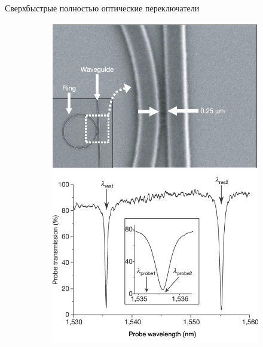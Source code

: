\begin{frame}{Сверхбыстрые полностью оптические переключатели}
	\begin{figure}
		\begin{subfigure}{.35\textwidth}
			\includegraphics[width=.95\textwidth]{img/ring}
			\vspace{.5em}
			\includegraphics[width=.95\textwidth]{img/ring_spectrum}
		\end{subfigure}%
		\begin{subfigure}{.65\textwidth}

\end{subfigure}
\end{figure}
\end{frame}
